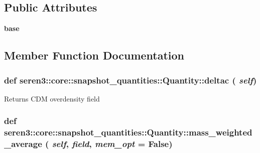 \subsection*{Public Attributes}
\begin{DoxyCompactItemize}
\item 
\hypertarget{classseren3_1_1core_1_1snapshot__quantities_1_1Quantity_ad6b66afb6d0642cdb570c57ea8bae4db}{
{\bfseries base}}
\label{classseren3_1_1core_1_1snapshot__quantities_1_1Quantity_ad6b66afb6d0642cdb570c57ea8bae4db}

\end{DoxyCompactItemize}


\subsection{Member Function Documentation}
\hypertarget{classseren3_1_1core_1_1snapshot__quantities_1_1Quantity_a7409d7e76fb3f406e9bd813e2d8e32c4}{
\subsubsection[{deltac}]{\setlength{\rightskip}{0pt plus 5cm}def seren3::core::snapshot\_\-quantities::Quantity::deltac ( {\em self})}}
\label{classseren3_1_1core_1_1snapshot__quantities_1_1Quantity_a7409d7e76fb3f406e9bd813e2d8e32c4}
\begin{DoxyVerb}
Returns CDM overdensity field
\end{DoxyVerb}
 \hypertarget{classseren3_1_1core_1_1snapshot__quantities_1_1Quantity_ac08785368045c8a4bac3acef49be02ee}{
\subsubsection[{mass\_\-weighted\_\-average}]{\setlength{\rightskip}{0pt plus 5cm}def seren3::core::snapshot\_\-quantities::Quantity::mass\_\-weighted\_\-average ( {\em self}, \/   {\em field}, \/   {\em mem\_\-opt} = {\ttfamily False})}}
\label{classseren3_1_1core_1_1snapshot__quantities_1_1Quantity_ac08785368045c8a4bac3acef49be02ee}
